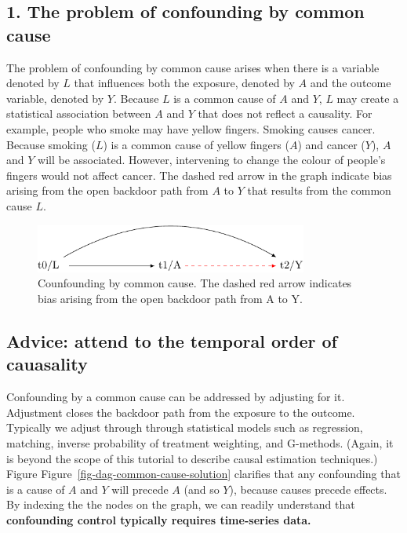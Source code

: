 \documentclass[
  singlecolumn]{report}
\begin{document}
\hypertarget{the-problem-of-confounding-by-common-cause}{%
\subsection{1. The problem of confounding by common
cause}\label{the-problem-of-confounding-by-common-cause}}

The problem of confounding by common cause arises when there is a
variable denoted by \(L\) that influences both the exposure, denoted by
\(A\) and the outcome variable, denoted by \(Y.\) Because \(L\) is a
common cause of \(A\) and \(Y\), \(L\) may create a statistical
association between \(A\) and \(Y\) that does not reflect a causality.
For example, people who smoke may have yellow fingers. Smoking causes
cancer. Because smoking (\(L\)) is a common cause of yellow fingers
(\(A\)) and cancer (\(Y\)), \(A\) and \(Y\) will be associated. However,
intervening to change the colour of people's fingers would not affect
cancer. The dashed red arrow in the graph indicate bias arising from the
open backdoor path from \(A\) to \(Y\) that results from the common
cause \(L\).

\begin{figure}

{\centering \includegraphics[width=0.8\textwidth,height=\textheight]{causal-dags_files/figure-pdf/fig-dag-common-cause-1.pdf}

}

\caption{\label{fig-dag-common-cause}Counfounding by common cause. The
dashed red arrow indicates bias arising from the open backdoor path from
A to Y.}

\end{figure}

\hypertarget{advice-attend-to-the-temporal-order-of-cauasality}{%
\subsection{Advice: attend to the temporal order of
cauasality}\label{advice-attend-to-the-temporal-order-of-cauasality}}

Confounding by a common cause can be addressed by adjusting for it.
Adjustment closes the backdoor path from the exposure to the outcome.
Typically we adjust through through statistical models such as
regression, matching, inverse probability of treatment weighting, and
G-methods. (Again, it is beyond the scope of this tutorial to describe
causal estimation techniques.) Figure
Figure~\ref{fig-dag-common-cause-solution} clarifies that any
confounding that is a cause of \(A\) and \(Y\) will precede \(A\) (and
so \(Y\)), because causes precede effects. By indexing the the nodes on
the graph, we can readily understand that \textbf{confounding control
typically requires time-series data.}
\end{document}
